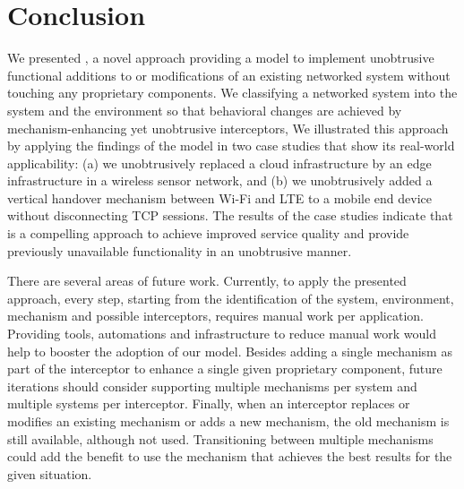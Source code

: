 \section{Conclusion}
\label{sec:conclusion}

We presented \mm, a novel approach providing a model to implement unobtrusive functional additions to or modifications of an existing networked system without touching any proprietary components.
We classifying a networked system into the system and the environment so that
behavioral changes are achieved by mechanism-enhancing yet unobtrusive interceptors,
We illustrated this approach by applying the findings of the model in two case studies that
show its real-world applicability:
(a) we unobtrusively replaced a cloud infrastructure by an edge infrastructure in a wireless sensor network, and
(b) we unobtrusively added a vertical handover mechanism between Wi-Fi and LTE to a mobile end device without disconnecting TCP sessions.
The results of the case studies indicate that \mm is a compelling approach to achieve improved service quality and provide previously unavailable functionality in an unobtrusive manner.

There are several areas of future work.
Currently, to apply the presented approach, every step, starting from the identification of the system, environment, mechanism and possible interceptors, requires manual work per application.
Providing tools, automations and infrastructure to reduce manual work would help to booster the adoption of our model.
Besides adding a single mechanism as part of the interceptor to enhance a single given proprietary component, future iterations should consider supporting multiple mechanisms per system and multiple systems per interceptor.
Finally, when an interceptor replaces or modifies an existing mechanism or adds a new mechanism, the old mechanism is still available, although not used.
Transitioning between multiple mechanisms could add the benefit to use the mechanism that achieves the best results for the given situation.